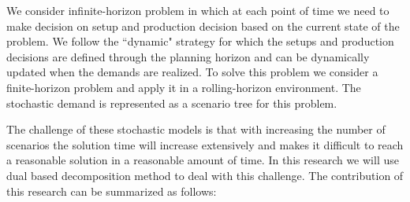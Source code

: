 \documentclass[10pt]{article}
\begin{document}
We consider infinite-horizon problem in which at each point of time we need to make decision on setup and production decision based on the current state of the problem. We follow the ``dynamic" strategy \cite{bookbinder1988strategies} for which the setups and production decisions are defined through the planning horizon and can be dynamically updated when the demands are realized. To solve this problem we consider a finite-horizon problem and apply it in a rolling-horizon environment. The stochastic demand is represented as a scenario tree for this problem.

The challenge of these stochastic models is that with increasing the number of scenarios the solution time will increase extensively and makes it difficult to reach a reasonable solution in a reasonable amount of time. In this research we will use dual based decomposition method to deal with this challenge. 
The contribution of this research can be summarized as follows:
\end{document}

